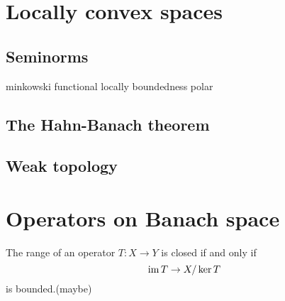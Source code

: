 \documentclass{../crs}
\begin{document}
\chapter{Locally convex spaces}
\section{Seminorms}
minkowski functional
locally boundedness
polar

\section{The Hahn-Banach theorem}

\section{Weak topology}


\chapter{Operators on Banach space}

The range of an operator $T:X\to Y$ is closed if and only if
\[\im T\to X/\ker T\]
is bounded.(maybe)
\end{document}
